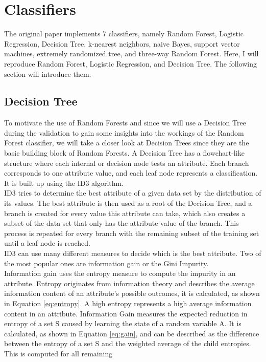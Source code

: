\section{Classifiers}
The original paper \cite{RN127} implements 7 classifiers, namely Random Forest, 
Logistic Regression, Decision Tree, k-nearest neighbors, naive Bayes, support 
vector machines, extremely randomized tree, and three-way Random Forest. Here, 
I 
will reproduce Random Forest, Logistic Regression, and Decision Tree. The 
following section will introduce them.
\subsection{Decision Tree}
To motivate the use of Random Forests and since we will 
use a Decision Tree during the validation to gain some insights into the 
workings of the Random Forest classifier, we will take a closer look 
at Decision Trees since they are the basic building block of Random Forests.
A Decision Tree has a flowchart-like structure where each internal or decision 
node tests an attribute. Each branch corresponds to one attribute value, and 
each leaf node represents a classification. It is built up using the ID3 
algorithm.
\\
ID3 tries to determine the best attribute of a given data set by the 
distribution of its values. The best attribute is then used as a root of the 
Decision Tree, and a branch is created for every value this attribute can take, 
which also creates a subset of the data set that only has the attribute value 
of the branch. This process is repeated for every branch with the remaining 
subset of the training set until a leaf node is reached.
\\
ID3 can use many different measures to decide which is the best attribute. Two 
of the most popular ones are information gain or the Gini Impurity.
\\
Information gain uses the entropy measure to compute the impurity in an 
attribute. Entropy originates from information theory and describes the average 
information content of an attribute's possible outcomes, it is calculated, as 
shown in Equation \ref{eq:entropy}. A high entropy represents a high average 
information content in an attribute. Information Gain measures the expected 
reduction in entropy of a set S caused by learning the state of a random 
variable A.  It is calculated, as shown in Equation \ref{eq:gain}, and can be 
described as the difference between the entropy of a set S and the 
weighted average of the child entropies. This is computed for all remaining 
